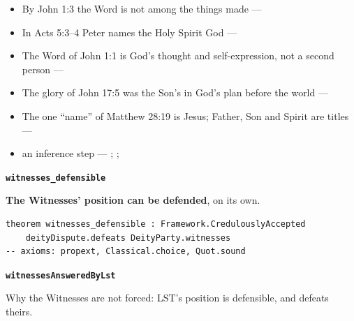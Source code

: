\documentclass[11pt,paper=\testimonypaper,DIV=13,parskip=false]{scrartcl}
\begin{document}
\begin{itemize}
\begin{itemize}
\item By John 1:3 the Word is not among the things made --- \cite[Tractates on John I.11]{schaff-nicene-post-nicene-fathers-1-7}
\item In Acts 5:3–4 Peter names the Holy Spirit God --- \cite[198]{calvin-commentary-acts-1844}
\item The Word of John 1:1 is God’s thought and self-expression, not a second person --- \cite[ch. 4 and 8, on John 1:1]{bernard-oneness-of-god-1983}
\item The glory of John 17:5 was the Son’s in God’s plan before the world --- \cite[ch. 8, The Preexistence of Jesus]{bernard-oneness-of-god-1983}
\item The one “name” of Matthew 28:19 is Jesus; Father, Son and Spirit are titles --- \cite[ch. 6, Matthew 28:19]{bernard-oneness-of-god-1983}
\item an inference step --- \cite[3, The Triune God]{kibbey-living-systematic-theology-2026}; \cite[ch. 4, Conclusion]{bernard-oneness-of-god-1983}; \cite[17--19]{buzzard-caveat-lector-2001}
\end{itemize}
\end{itemize}
\par\medskip\noindent\textbf{\texttt{witnesses\_\allowbreak{}defensible}}\par\nobreak\noindent
\textbf{The Witnesses’ position can be defended}, on its own.

{\small\begin{verbatim}
theorem witnesses_defensible : Framework.CredulouslyAccepted
    deityDispute.defeats DeityParty.witnesses
-- axioms: propext, Classical.choice, Quot.sound
\end{verbatim}}
\par\medskip\noindent\textbf{\texttt{witnesses\allowbreak{}Answered\allowbreak{}By\allowbreak{}Lst}}\par\nobreak\noindent
Why the Witnesses are not forced: LST’s position is defensible, and defeats theirs.
\end{document}
